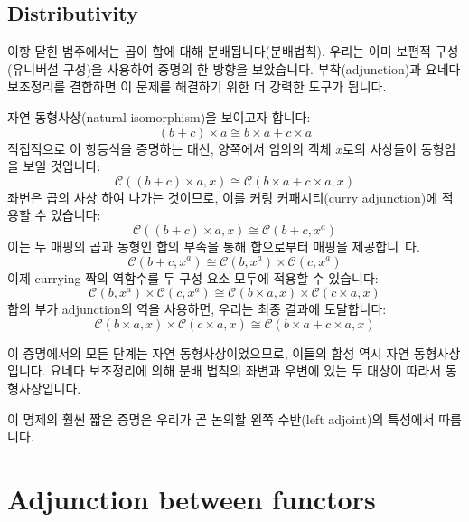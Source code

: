 \documentclass[DaoFP]{subfiles}
\begin{document}
\subsection{Distributivity}

이항 닫힌 범주에서는 곱이 합에 대해 분배됩니다(분배법칙). 우리는 이미 보편적 구성(유니버설 구성)을 사용하여 증명의 한 방향을 보았습니다. 부착(adjunction)과 요네다 보조정리를 결합하면 이 문제를 해결하기 위한 더 강력한 도구가 됩니다.

자연 동형사상(natural isomorphism)을 보이고자 합니다:
\[(b + c) \times a \cong b \times a + c \times a \]
직접적으로 이 항등식을 증명하는 대신, 양쪽에서 임의의 객체 $x$로의 사상들이 동형임을 보일 것입니다:
\[  \mathcal{C} ((b + c) \times a, x) \cong \mathcal{C}(b \times a + c \times a, x) \]
좌변은 곱의 사상 하여 나가는 것이므로, 이를 커링 커패시티(curry adjunction)에 적용할 수 있습니다:
\[  \mathcal{C} ((b + c) \times a, x) \cong \mathcal{C}(b + c, x^a) \]
이는 두 매핑의 곱과 동형인 합의 부속을 통해 합으로부터 매핑을 제공합니~다.
\[  \mathcal{C}(b + c, x^a) \cong \mathcal{C}(b, x^a) \times \mathcal{C}(c, x^a)\]
이제 currying 짝의 역함수를 두 구성 요소 모두에 적용할 수 있습니다:
\[  \mathcal{C}(b, x^a) \times \mathcal{C}(c, x^a) \cong \mathcal{C}(b \times a, x) \times \mathcal{C}(c \times a, x)\]
합의 부가 adjunction의 역을 사용하면, 우리는 최종 결과에 도달합니다:
\[ \mathcal{C}(b \times a, x) \times \mathcal{C}(c \times a, x) \cong \mathcal{C}(b \times a + c \times a, x) \]

이 증명에서의 모든 단계는 자연 동형사상이었으므로, 이들의 합성 역시 자연 동형사상입니다. 요네다 보조정리에 의해 분배 법칙의 좌변과 우변에 있는 두 대상이 따라서 동형사상입니다.

이 명제의 훨씬 짧은 증명은 우리가 곧 논의할 왼쪽 수반(left adjoint)의 특성에서 따릅니다.

\section{Adjunction between functors}
\end{document}
